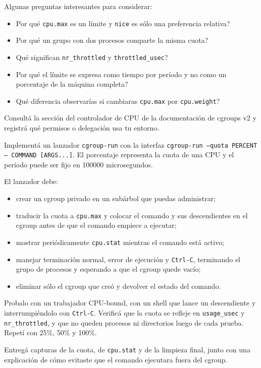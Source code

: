 \documentclass[11pt,a4paper]{article}
\begin{document}
Algunas preguntas interesantes para considerar:

\begin{itemize}[leftmargin=*]
  \item Por qué \texttt{cpu.max} es un límite y \texttt{nice} es sólo una
  preferencia relativa?
  \item Por qué un grupo con dos procesos comparte la misma cuota?
  \item Qué significan \texttt{nr\_throttled} y
  \texttt{throttled\_usec}?
  \item Por qué el límite se expresa como tiempo por período y no como un
  porcentaje de la máquina completa?
  \item Qué diferencia observarías si cambiaras \texttt{cpu.max} por
  \texttt{cpu.weight}?
\end{itemize}

Consultá la sección del controlador de CPU de la documentación de cgroups v2
y registrá qué permisos o delegación usa tu entorno.

\begin{bonusbox}
Implementá un lanzador \texttt{cgroup-run} con la interfaz
\texttt{cgroup-run --quota PERCENT -- COMMAND [ARGS...]}. El porcentaje
representa la cuota de una CPU y el período puede ser fijo en 100000
microsegundos.

El lanzador debe:

\begin{itemize}[leftmargin=*]
  \item crear un cgroup privado en un subárbol que puedas administrar;
  \item traducir la cuota a \texttt{cpu.max} y colocar el comando y sus
  descendientes en el cgroup antes de que el comando empiece a ejecutar;
  \item mostrar periódicamente \texttt{cpu.stat} mientras el comando está
  activo;
  \item manejar terminación normal, error de ejecución y \texttt{Ctrl-C},
  terminando el grupo de procesos y esperando a que el cgroup quede vacío;
  \item eliminar sólo el cgroup que creó y devolver el estado del comando.
\end{itemize}

Probalo con un trabajador CPU-bound, con un shell que lance un descendiente y
interrumpiéndolo con \texttt{Ctrl-C}. Verificá que la cuota se refleje en
\texttt{usage\_usec} y \texttt{nr\_throttled}, y que no queden procesos ni
directorios luego de cada prueba. Repetí con 25\%, 50\% y 100\%.

Entregá capturas de la cuota, de \texttt{cpu.stat} y de la limpieza final,
junto con una explicación de cómo evitaste que el comando ejecutara fuera del
cgroup.
\end{bonusbox}
\end{document}

